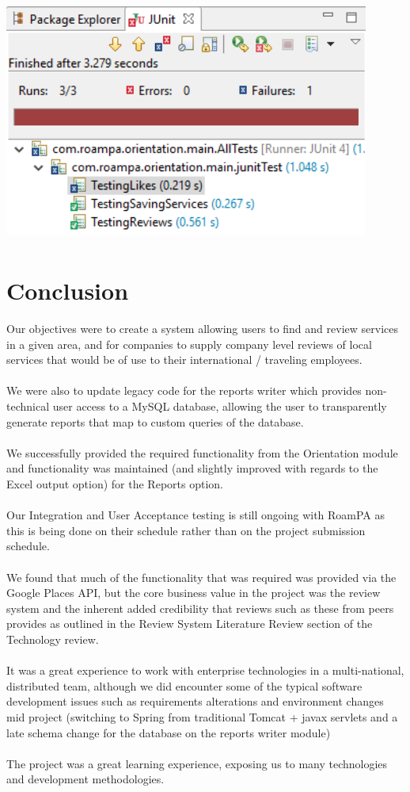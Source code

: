 \begin{center}    
	\includegraphics[height=8cm, width=12cm]{img/junit.png}
\end{center}

\chapter{Conclusion}
Our objectives were to create a system allowing users to find and review services in a given area, and for companies to supply company level reviews of local services that would be of use to their international / traveling employees.\\\\
We were also to update legacy code for the reports writer which provides non-technical user access to a MySQL database, allowing the user to transparently generate reports that map to custom queries of the database.\\\\
We successfully provided the required functionality from the Orientation module and functionality was maintained (and slightly improved with regards to the Excel output option) for the Reports option.\\\\
Our Integration and User Acceptance testing is still ongoing with RoamPA as this is being done on their schedule rather than on the project submission schedule.\\\\
We found that much of the functionality that was required was provided via the Google Places API, but the core business value in the project was the review system and the inherent added credibility that reviews such as these from peers provides as outlined in the Review System Literature Review section of the Technology review.\\\\
It was a great experience to work with enterprise technologies in a multi-national, distributed team, although we did encounter some of the typical software development issues such as requirements alterations and environment changes mid project (switching to Spring from traditional Tomcat + javax servlets and a late schema change for the database on the reports writer module) \\\\
The project was a great learning experience, exposing us to many technologies and development methodologies.

